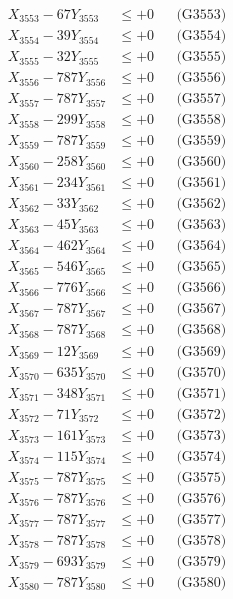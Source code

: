 \documentclass[a4paper,10pt]{article}
\begin{document}
{\begin{align}
X_{3553} - 67Y_{3553} &\leq +0 && \text{(G3553)} \\
X_{3554} - 39Y_{3554} &\leq +0 && \text{(G3554)} \\
X_{3555} - 32Y_{3555} &\leq +0 && \text{(G3555)} \\
X_{3556} - 787Y_{3556} &\leq +0 && \text{(G3556)} \\
X_{3557} - 787Y_{3557} &\leq +0 && \text{(G3557)} \\
X_{3558} - 299Y_{3558} &\leq +0 && \text{(G3558)} \\
X_{3559} - 787Y_{3559} &\leq +0 && \text{(G3559)} \\
X_{3560} - 258Y_{3560} &\leq +0 && \text{(G3560)} \\
\allowbreak
X_{3561} - 234Y_{3561} &\leq +0 && \text{(G3561)} \\
X_{3562} - 33Y_{3562} &\leq +0 && \text{(G3562)} \\
X_{3563} - 45Y_{3563} &\leq +0 && \text{(G3563)} \\
X_{3564} - 462Y_{3564} &\leq +0 && \text{(G3564)} \\
X_{3565} - 546Y_{3565} &\leq +0 && \text{(G3565)} \\
X_{3566} - 776Y_{3566} &\leq +0 && \text{(G3566)} \\
X_{3567} - 787Y_{3567} &\leq +0 && \text{(G3567)} \\
X_{3568} - 787Y_{3568} &\leq +0 && \text{(G3568)} \\
X_{3569} - 12Y_{3569} &\leq +0 && \text{(G3569)} \\
X_{3570} - 635Y_{3570} &\leq +0 && \text{(G3570)} \\
\allowbreak
X_{3571} - 348Y_{3571} &\leq +0 && \text{(G3571)} \\
X_{3572} - 71Y_{3572} &\leq +0 && \text{(G3572)} \\
X_{3573} - 161Y_{3573} &\leq +0 && \text{(G3573)} \\
X_{3574} - 115Y_{3574} &\leq +0 && \text{(G3574)} \\
X_{3575} - 787Y_{3575} &\leq +0 && \text{(G3575)} \\
X_{3576} - 787Y_{3576} &\leq +0 && \text{(G3576)} \\
X_{3577} - 787Y_{3577} &\leq +0 && \text{(G3577)} \\
X_{3578} - 787Y_{3578} &\leq +0 && \text{(G3578)} \\
X_{3579} - 693Y_{3579} &\leq +0 && \text{(G3579)} \\
X_{3580} - 787Y_{3580} &\leq +0 && \text{(G3580)} \\

\end{align}}
\end{document}
